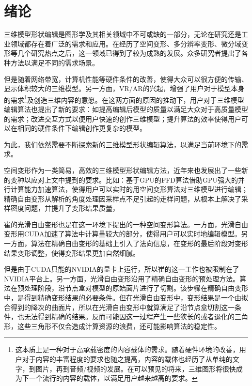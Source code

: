 
\chapter{绪论}

    三维模型形状编辑是图形学及其相关领域中不可或缺的一部分，无论在研究还是工业领域都存在着广泛的需求和应用。在经历了空间变形、多分辨率变形、微分域变形等几个研究热点之后，这一领域已得到了较为成熟的发展。众多研究者提出了各种方法以满足不同的需求场景。

    但是随着网络带宽，计算机性能等硬件条件的改善，使得大众可以很方便的传输、显示体积较大的三维模型。另一方面，VR/AR的兴起，增强了用户对于模型本身的需求\footnote{这本质上是一种对于高承载密度的内容载体的需求。随着硬件环境的改善，用户对于内容的丰富程度的要求也随之提高，内容的载体也经历了从单纯的文字，到图片，再到音频/视频的发展。在可以预见的将来，三维图形将很快成为下一个流行的内容的载体，以满足用户越来越高的要求。}及创造三维内容的意愿。在这两方面的原因的推动下，用户对于三维模型编辑算法也提出了新的要求：如提高编辑后模型的质量以满足大众对于高质量模型的需求；改进交互方式以便用户快速的创作三维模型；提升算法的效率使得用户可以在相同的硬件条件下编辑创作更复杂的模型。

    为此，我们依然需要不断探索新的三维模型形状编辑算法，以满足当前环境下的需求。

    空间变形作为一类简易，高效的三维模型形状编辑方法，近年来也发展出了一些新的变种以应对上文中提到的要求。比如：基于GPU的FFD算法\cite{chua2000, modat2010}借助GPU强大的并行计算能力加速算法，使得用户可以实时的用空间变形算法对三维模型进行编辑；精确自由变形\cite{Feng98, Feng00}从解析的角度处理因采样点不足引起的走样问题，从根本上解决了采样密度问题，并提升了变形结果质量，

    崔的光滑自由变形\cite{Cui15}也是在这一环境下提出的一种空间变形算法。一方面，光滑自由变形用CUDA加速了算法中计算量较大的部分，使得用户可以实时地编辑模型。另一方面，算法在精确自由变形的基础上引入了法向信息，在变形的最后阶段对变形结果变形调整，使得变形结果更加自然细腻。

    但是由于CUDA只能的NVIDIA的显卡上运行，所以崔的这一工作也被限制在了NVIDIA平台上。另一方面，光滑自由变形沿用了精确自由变形\cite{Feng98, Feng00}的预处理方法。算法在预处理阶段，沿节点盒对模型的原始面片进行了切割。该步骤在精确自由变形中，是得到精确变形结果的必要条件。但在光滑自由变形中，变形结果是一个由拟合得到的降次的曲面片，所以在光滑自由变形中就算满足了沿节点盒切割这一条件，也无法得到精确的结果。反而可能因这一过程产生一些狭长的或者退化的三角形，这些三角形不仅会造成计算资源的浪费，还可能影响算法的稳定性。 


